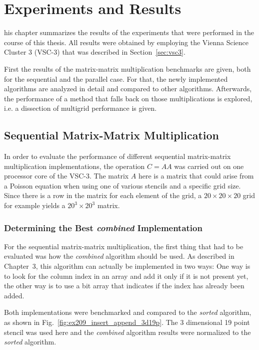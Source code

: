 \chapter{Experiments and Results}
his chapter summarizes the results of the experiments that were performed in the course of this thesis. All results were obtained by employing the Vienna Science Cluster 3 (VSC-3) that was described in Section~\ref{sec:vsc3}. 

First the results of the matrix-matrix multiplication benchmarks are given, both for the sequential and the parallel case. For that, the newly implemented algorithms are analyzed in detail and compared to other algorithms. Afterwards, the performance of a method that falls back on those multiplications is explored, i.e. a dissection of multigrid performance is given.

\section{Sequential Matrix-Matrix Multiplication}

In order to evaluate the performance of different sequential matrix-matrix multiplication implementations, the operation $C = AA$ was carried out on one processor core of the VSC-3. The matrix $A$ here is a matrix that could arise from a Poisson equation when using one of various stencils and a specific grid size. Since there is a row in the matrix for each element of the grid, a $20\times 20 \times 20$ grid for example yields a $20^3 \times 20^3$ matrix.

\subsection{Determining the Best \textit{combined} Implementation}
For the sequential matrix-matrix multiplication, the first thing that had to be evaluated was how the \textit{combined} algorithm should be used. As described in Chapter~3, this algorithm can actually be implemented in two ways: One way is to look for the column index in an array and add it only if it is not present yet, the other way is to use a bit array that indicates if the index has already been added. 

Both implementations were benchmarked and compared to the \textit{sorted} algorithm, as shown in Fig.~\ref{fig:ex209_insert_append_3d19p}. The 3 dimensional 19 point stencil was used here and the \textit{combined} algorithm results were normalized to the \textit{sorted} algorithm. 

